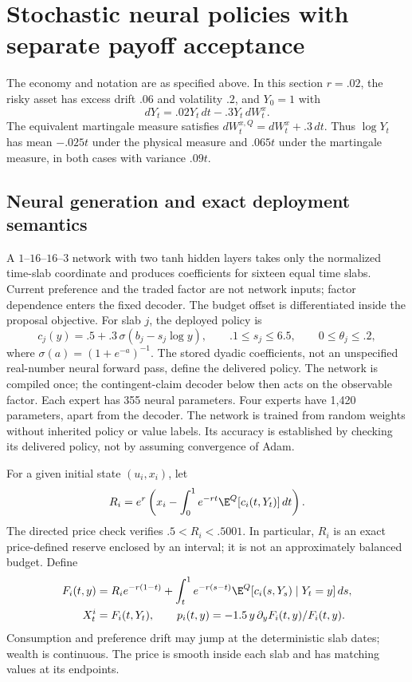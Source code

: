 \section{Stochastic neural policies with separate payoff acceptance}\label{sec:r21method}
The economy and notation are as specified above. In this section $r=.02$, the risky asset has excess drift $.06$ and volatility $.2$, and $Y_0=1$ with
\[
 dY_t=.02Y_t\,dt-.3Y_t\,dW^x_t.
\]
The equivalent martingale measure satisfies $dW^{x,Q}_t=dW^x_t+.3\,dt$. Thus $\log Y_t$ has mean $-.025t$ under the physical measure and $.065t$ under the martingale measure, in both cases with variance $.09t$.

\subsection{Neural generation and exact deployment semantics}
A $1$--$16$--$16$--$3$ network with two tanh hidden layers takes only the normalized time-slab coordinate and produces coefficients for sixteen equal time slabs. Current preference and the traded factor are not network inputs; factor dependence enters the fixed decoder. The budget offset is differentiated inside the proposal objective. For slab $j$, the deployed policy is
\begin{equation}
 c_j(y)=.5+.3\,\sigma(b_j-s_j\log y),\qquad
 .1\leq s_j\leq6.5,\qquad 0\leq\theta_j\leq.2,
 \label{eq:r21cons}
\end{equation}
where $\sigma(a)=(1+e^{-a})^{-1}$. The stored dyadic coefficients, not an unspecified real-number neural forward pass, define the delivered policy. The network is compiled once; the contingent-claim decoder below then acts on the observable factor. Each expert has 355 neural parameters. Four experts have 1,420 parameters, apart from the decoder. The network is trained from random weights without inherited policy or value labels. Its accuracy is established by checking its delivered policy, not by assuming convergence of Adam.

For a given initial state $(u_i,x_i)$, let
\begin{equation}
 R_i=e^r\left(x_i-\int_0^1 e^{-rt}\E^Q[c_i(t,Y_t)]\,dt\right).
 \label{eq:r21reserve}
\end{equation}
The directed price check verifies $ .5<R_i<.5001$. In particular, $R_i$ is an exact price-defined reserve enclosed by an interval; it is not an approximately balanced budget. Define
\begin{align}
 F_i(t,y)&=R_i e^{-r(1-t)}+
   \int_t^1 e^{-r(s-t)}\E^Q[c_i(s,Y_s)\mid Y_t=y]\,ds,\label{eq:r21price}\\
 X^i_t&=F_i(t,Y_t),\qquad
 p_i(t,y)=-1.5\,y\,\partial_yF_i(t,y)/F_i(t,y).
 \label{eq:r21hedge}
\end{align}
Consumption and preference drift may jump at the deterministic slab dates; wealth is continuous. The price is smooth inside each slab and has matching values at its endpoints.

